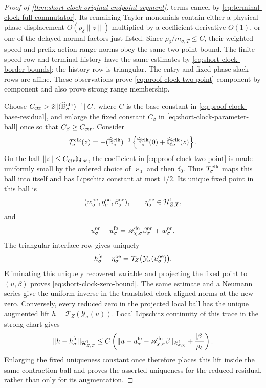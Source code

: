 \begin{proof}[Proof of
\cref{thm:short-clock-original-endpoint-segment}]
terms cancel by
\cref{eq:terminal-clock-full-commutator}.  Its remaining Taylor monomials
contain either a physical phase displacement
\(O(\rho_\delta\|z\|)\) multiplied by a coefficient derivative
\(O(1)\), or one of the delayed normal factors just listed.
Since
\(\rho_\delta/m_{\sigma,T}\le C\), their weighted-speed and
prefix-action range norms obey the same two-point bound.  The finite speed
row and terminal history have the same estimates by
\cref{eq:short-clock-border-bounds}; the history row is triangular.  The
entry and fixed phase-slack rows are affine.  These observations prove
\cref{eq:proof-clock-two-point} component by component and also prove
strong range membership.

Choose \(C_{\rm ctr}>2\|(\widehat{\mathbb B}_\sigma^{\rm clk})^{-1}\|C\), where
\(C\) is the base constant in \cref{eq:proof-clock-base-residual}, and
enlarge the fixed constant \(C_\beta\) in
\cref{eq:short-clock-parameter-ball} once so that
\(C_\beta\ge C_{\rm ctr}\).
Consider
\begin{equation}
 \mathcal T_\sigma^{\rm clk}(z)
 =-(\widehat{\mathbb B}_\sigma^{\rm clk})^{-1}
   \left\{\widehat{\mathbb F}_\sigma^{\rm clk}(0)
       +\widehat{\mathbb Q}_\sigma^{\rm clk}(z)\right\}. \label{eq:proof-clock-contraction}
\end{equation}
On the ball
\(\|z\|\le C_{\rm ctr}\mathfrak b_{\delta,\varkappa}\), the coefficient in
\cref{eq:proof-clock-two-point} is made uniformly small by the ordered
choice of \(\varkappa_0\) and then \(\delta_0\).  Thus
\(\mathcal T_\sigma^{\rm clk}\) maps this ball into itself and has
Lipschitz constant at most \(1/2\).  Its unique fixed point in this ball is
\[
 (w_\sigma^{\rm oe},\eta_\sigma^{\rm oe},
       \beta_\sigma^{\rm oe}),
 \qquad \eta_\sigma^{\rm oe}\in\mathcal H_{Z,T}^1,
\]
and
\[
 u_\sigma^{\rm oe}-u_\sigma^{\rm fe}
 =\mathscr A_{\chi,\sigma}^{\rm fe}\beta_\sigma^{\rm oe}
       +w_\sigma^{\rm oe},
\]
The triangular interface row gives uniquely
\[
 h_\sigma^{\rm fe}+\eta_\sigma^{\rm oe}
 =\mathcal T_Z\bigl(\mathcal Y_\sigma(u_\sigma^{\rm oe})\bigr).
\]
Eliminating this uniquely recovered variable and projecting the fixed point
to \((u,\beta)\) proves
\cref{eq:short-clock-zero-bound}.  The same estimate and a Neumann series
give the uniform inverse in the translated clock-aligned norms at the new
zero.  Conversely, every reduced zero in the projected local ball has the
unique augmented lift
\(h=\mathcal T_Z(\mathcal Y_\sigma(u))\).  Local Lipschitz continuity of
this trace in the strong chart gives
\[
 \|h-h_\sigma^{\rm fe}\|_{\mathcal H_{Z,T}^1}
 \le C\left(
     \|u-u_\sigma^{\rm fe}
       -\mathscr A_{\chi,\sigma}^{\rm fe}\beta\|_
          {\mathcal X_{\sigma,\chi}^1}
       +\frac{|\beta|}{\rho_\delta}
       \right).
\]
Enlarging the fixed uniqueness constant once therefore places this lift
inside the same contraction ball and proves the asserted uniqueness for
the reduced residual, rather than only for its augmentation.


\end{proof}
